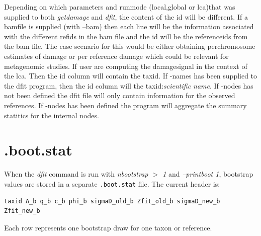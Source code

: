 \documentclass[10pt]{article}
\begin{document}
Depending on which parameters and runmode (local,global or lca)that was supplied to both
\emph{getdamage} and \emph{dfit}, the content of the id will be
different. If a bamfile is supplied (with --bam) then each line will be
the information associated with the different refids in the bam file
and the id will be the referenceids from the bam file. The case
scenario for this would be either obtaining perchromosome estimates of
damage or per reference damage which could be relevant for metagenomic
studies. If user are computing the damagesignal in the context of the
lca. Then the id column will contain the taxid. If -names has been
supplied to the dfit program, then the id column will the
taxid:\emph{scientific name}. If -nodes has not been defined the
dfit file will only contain information for the observed
references. If -nodes has been defined the program will aggregate the
summary statitics for the internal nodes.


\section{.boot.stat}
When the \textit{dfit} command is run with \textit{nbootstrap $>$ 1} and
\textit{--printboot 1}, bootstrap values are stored in a separate
\texttt{.boot.stat} file. The current header is:
\begin{verbatim}
taxid A_b q_b c_b phi_b sigmaD_old_b Zfit_old_b sigmaD_new_b Zfit_new_b
\end{verbatim}
Each row represents one bootstrap draw for one taxon or reference.
\end{document}
